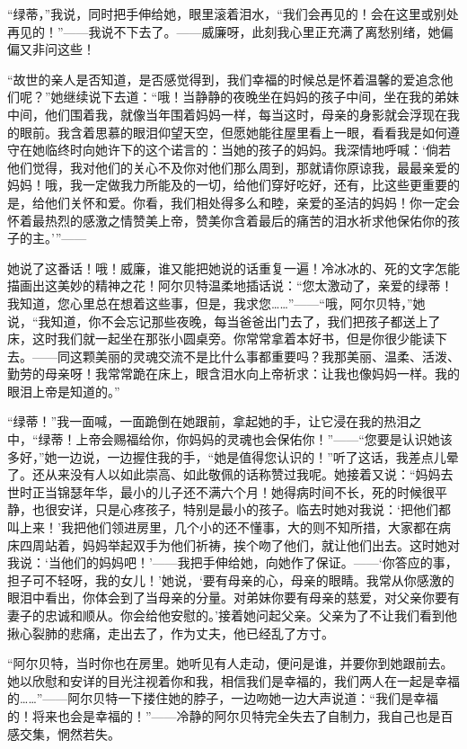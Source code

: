 \documentclass[12pt,oneside]{book}
\begin{document}
“绿蒂，”我说，同时把手伸给她，眼里滚着泪水，“我们会再见的！会在这里或别处再见的！”——我说不下去了。——威廉呀，此刻我心里正充满了离愁别绪，她偏偏又非问这些！

“故世的亲人是否知道，是否感觉得到，我们幸福的时候总是怀着温馨的爱追念他们呢？”她继续说下去道：“哦！当静静的夜晚坐在妈妈的孩子中间，坐在我的弟妹中间，他们围着我，就像当年围着妈妈一样，每当这时，母亲的身影就会浮现在我的眼前。我含着思慕的眼泪仰望天空，但愿她能往屋里看上一眼，看看我是如何遵守在她临终时向她许下的这个诺言的：当她的孩子的妈妈。我深情地呼喊：‘倘若他们觉得，我对他们的关心不及你对他们那么周到，那就请你原谅我，最最亲爱的妈妈！哦，我一定做我力所能及的一切，给他们穿好吃好，还有，比这些更重要的是，给他们关怀和爱。你看，我们相处得多么和睦，亲爱的圣洁的妈妈！你一定会怀着最热烈的感激之情赞美上帝，赞美你含着最后的痛苦的泪水祈求他保佑你的孩子的主。’”——

她说了这番话！哦！威廉，谁又能把她说的话重复一遍！冷冰冰的、死的文字怎能描画出这美妙的精神之花！阿尔贝特温柔地插话说：“您太激动了，亲爱的绿蒂！我知道，您心里总在想着这些事，但是，我求您……”——“哦，阿尔贝特，”她说，“我知道，你不会忘记那些夜晚，每当爸爸出门去了，我们把孩子都送上了床，这时我们就一起坐在那张小圆桌旁。你常常拿着本好书，但是你很少能读下去。——同这颗美丽的灵魂交流不是比什么事都重要吗？我那美丽、温柔、活泼、勤劳的母亲呀！我常常跪在床上，眼含泪水向上帝祈求：让我也像妈妈一样。我的眼泪上帝是知道的。”

“绿蒂！”我一面喊，一面跪倒在她跟前，拿起她的手，让它浸在我的热泪之中，“绿蒂！上帝会赐福给你，你妈妈的灵魂也会保佑你！”——“您要是认识她该多好，”她一边说，一边握住我的手，“她是值得您认识的！”听了这话，我差点儿晕了。还从来没有人以如此崇高、如此敬佩的话称赞过我呢。她接着又说：“妈妈去世时正当锦瑟年华，最小的儿子还不满六个月！她得病时间不长，死的时候很平静，也很安详，只是心疼孩子，特别是最小的孩子。临去时她对我说：‘把他们都叫上来！’我把他们领进房里，几个小的还不懂事，大的则不知所措，大家都在病床四周站着，妈妈举起双手为他们祈祷，挨个吻了他们，就让他们出去。这时她对我说：‘当他们的妈妈吧！’——我把手伸给她，向她作了保证。——‘你答应的事，担子可不轻呀，我的女儿！’她说，‘要有母亲的心，母亲的眼睛。我常从你感激的眼泪中看出，你体会到了当母亲的分量。对弟妹你要有母亲的慈爱，对父亲你要有妻子的忠诚和顺从。你会给他安慰的。’接着她问起父亲。父亲为了不让我们看到他揪心裂肺的悲痛，走出去了，作为丈夫，他已经乱了方寸。

“阿尔贝特，当时你也在房里。她听见有人走动，便问是谁，并要你到她跟前去。她以欣慰和安详的目光注视着你和我，相信我们是幸福的，我们两人在一起是幸福的……”——阿尔贝特一下搂住她的脖子，一边吻她一边大声说道：“我们是幸福的！将来也会是幸福的！”——冷静的阿尔贝特完全失去了自制力，我自己也是百感交集，惘然若失。
\end{document}
